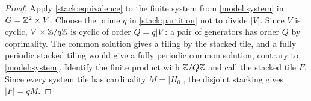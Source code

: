 \begin{proof}
Apply \cref{stack:equivalence} to the finite system from
\cref{model:system} in $G=\mathbb Z^2\times V$.  Choose the prime $q$ in
\cref{stack:partition} not to divide $|V|$.  Since $V$ is cyclic,
$V\times\mathbb Z/q\mathbb Z$ is cyclic of order $Q=q|V|$: a pair of generators
has order $Q$ by coprimality.  The common solution gives a tiling by
the stacked tile, and a fully periodic stacked tiling would give a
fully periodic common solution, contrary to \cref{model:system}.
Identify the finite product with $\mathbb Z/Q\mathbb Z$ and call the stacked tile
$F$. Since every system tile has cardinality $M=|H_0|$, the
disjoint stacking gives $|F|=qM$.
\end{proof}
